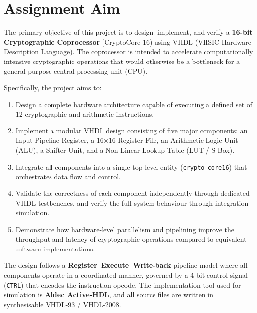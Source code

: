 \documentclass[12pt, a4paper]{report}
\begin{document}
\clearpage
\hypersetup{pageanchor=true}

\clearpage
{
  \hypersetup{linkcolor=black}
  \renewcommand{\contentsname}{Table of Contents}
  \tableofcontents
}
\newpage

\chapter{Assignment Aim}

The primary objective of this project is to design, implement, and verify a
\textbf{16-bit Cryptographic Coprocessor} (CryptoCore-16) using VHDL (VHSIC Hardware Description Language).
The coprocessor is intended to accelerate computationally intensive cryptographic operations
that would otherwise be a bottleneck for a general-purpose central processing unit (CPU).

Specifically, the project aims to:

\begin{enumerate}[label=\arabic*.]
  \item Design a complete hardware architecture capable of executing a defined set of 12
        cryptographic and arithmetic instructions.
  \item Implement a modular VHDL design consisting of five major components:
        an Input Pipeline Register, a 16$\times$16 Register File, an Arithmetic Logic Unit (ALU),
        a Shifter Unit, and a Non-Linear Lookup Table (LUT / S-Box).
  \item Integrate all components into a single top-level entity (\texttt{crypto\_core16})
        that orchestrates data flow and control.
  \item Validate the correctness of each component independently through dedicated VHDL
        testbenches, and verify the full system behaviour through integration simulation.
  \item Demonstrate how hardware-level parallelism and pipelining improve the throughput
        and latency of cryptographic operations compared to equivalent software implementations.
\end{enumerate}

The design follows a \textbf{Register–Execute–Write-back} pipeline model where all components
operate in a coordinated manner, governed by a 4-bit control signal (\texttt{CTRL}) that encodes
the instruction opcode. The implementation tool used for simulation is
\textbf{Aldec Active-HDL}, and all source files are written in synthesisable VHDL-93 / VHDL-2008.
\end{document}
